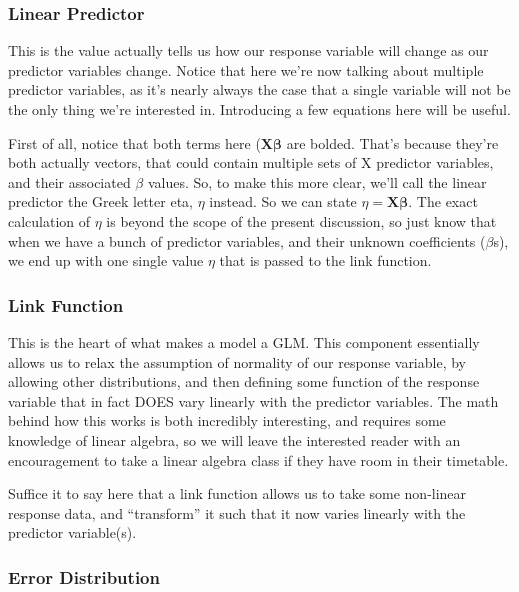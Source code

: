 \documentclass[
]{article}
\begin{document}
\hypertarget{linear-predictor}{%
\subsubsection{Linear Predictor}\label{linear-predictor}}

This is the value actually tells us how our response variable will
change as our predictor variables change. Notice that here we're now
talking about multiple predictor variables, as it's nearly always the
case that a single variable will not be the only thing we're interested
in. Introducing a few equations here will be useful.

First of all, notice that both terms here
(\(\textbf{X}\boldsymbol{\beta}\) are bolded. That's because they're
both actually vectors, that could contain multiple sets of \(\text{X}\)
predictor variables, and their associated \(\beta\) values. So, to make
this more clear, we'll call the linear predictor the Greek letter eta,
\(\eta\) instead. So we can state
\(\eta = \textbf{X}\boldsymbol{\beta}\). The exact calculation of
\(\eta\) is beyond the scope of the present discussion, so just know
that when we have a bunch of predictor variables, and their unknown
coefficients (\(\beta\)s), we end up with one single value \(\eta\) that
is passed to the link function.

\hypertarget{link-function}{%
\subsubsection{Link Function}\label{link-function}}

This is the heart of what makes a model a GLM. This component
essentially allows us to relax the assumption of normality of our
response variable, by allowing other distributions, and then defining
some function of the response variable that in fact DOES vary linearly
with the predictor variables. The math behind how this works is both
incredibly interesting, and requires some knowledge of linear algebra,
so we will leave the interested reader with an encouragement to take a
linear algebra class if they have room in their timetable.

Suffice it to say here that a link function allows us to take some
non-linear response data, and ``transform'' it such that it now varies
linearly with the predictor variable(s).

\hypertarget{error-distribution}{%
\subsubsection{Error Distribution}\label{error-distribution}}
\end{document}
